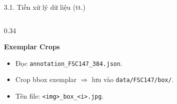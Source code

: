 \documentclass[11pt]{beamer}
\begin{document}
\begin{frame}{3.1. Tiền xử lý dữ liệu (tt.)}
\begin{columns}[T,onlytextwidth]
\begin{column}{0.34\textwidth}
\begin{block}{\textbf{Exemplar Crops}}
\begin{itemize}\setlength{\itemsep}{1pt}
  \item Đọc \texttt{annotation\_FSC147\_384.json}.
  \item Crop bbox exemplar $\Rightarrow$ lưu vào \texttt{data/FSC147/box/}.
  \item Tên file: \texttt{<img>\_box\_<i>.jpg}.
\end{itemize}
\end{block}
\end{column}
\end{columns}

\end{frame}
\end{document}
